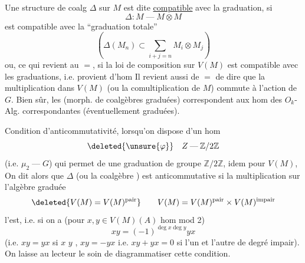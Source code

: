 Une structure de coalg $\Delta$ sur $M$ est dite \uline{compatible} avec la graduation, si
\[
\Delta:M\mathbin{\text{---}}M\otimes M
\]
est compatible avec la ``graduation totale''
\[
\left(\Delta(M_n)\subset\sum_{i+j=n}M_i\otimes M_j\right)
\]
ou, ce qui revient au $=$, si la loi de composition sur $V(M)$ est compatible avec les graduations, i.e. provient d'hom
Il revient aussi de $=$ de dire que la multiplication dans $V(M)$ (ou la comultiplication de $M$) commute à l'action de $G$.
Bien sûr, les (morph. de coalgèbres graduées) correspondent aux hom des $O_k$-Alg. correspondantes (éventuellement graduées).

Condition d'anticommutativité, lorsqu'on dispose d'un hom
\[
\deleted{\unsure{\varphi}}\quad Z\mathbin{\text{---}}\mathbb{Z}/2\mathbb{Z}
\]
(i.e. $\mu_2\mathbin{\text{---}}G$) qui permet de  une graduation de  groupe $\mathbb{Z}/2\mathbb{Z}$, idem pour $V(M)$,
On dit alors que $\Delta$ (ou la coalgèbre ) est anticommutative si  la multiplication sur  l'algèbre graduée
\[
\deleted{V(M)=V(M)^{\mathrm{pair}}}\qquad
V(M)=V(M)^{\mathrm{pair}}\times V(M)^{\mathrm{impair}}
\]
l'est, i.e. si on a (pour $x,y\in V(M)(A)$ hom mod 2)
\[
xy=(-1)^{\deg x\deg y}yx
\]
(i.e. $xy=yx$ si $x$  $y$ ,  $xy=-yx$ i.e. $xy+yx=0$ si l'un et l'autre de degré impair). On laisse au lecteur le soin de diagrammatiser cette condition.

